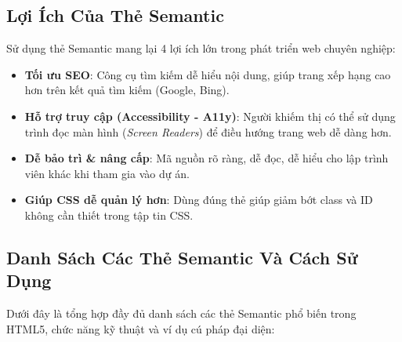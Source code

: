 \subsection{Lợi Ích Của Thẻ Semantic}

Sử dụng thẻ Semantic mang lại 4 lợi ích lớn trong phát triển web chuyên nghiệp:

\begin{itemize}[leftmargin=1.8em, itemsep=6pt, parsep=0pt]
    \item \textbf{Tối ưu SEO}: Công cụ tìm kiếm dễ hiểu nội dung, giúp trang xếp hạng cao hơn trên kết quả tìm kiếm (Google, Bing).
    \item \textbf{Hỗ trợ truy cập (Accessibility - A11y)}: Người khiếm thị có thể sử dụng trình đọc màn hình (\textit{Screen Readers}) để điều hướng trang web dễ dàng hơn.
    \item \textbf{Dễ bảo trì \& nâng cấp}: Mã nguồn rõ ràng, dễ đọc, dễ hiểu cho lập trình viên khác khi tham gia vào dự án.
    \item \textbf{Giúp CSS dễ quản lý hơn}: Dùng đúng thẻ giúp giảm bớt class và ID không cần thiết trong tập tin CSS.
\end{itemize}

\subsection{Danh Sách Các Thẻ Semantic Và Cách Sử Dụng}

Dưới đây là tổng hợp đầy đủ danh sách các thẻ Semantic phổ biến trong HTML5, chức năng kỹ thuật và ví dụ cú pháp đại diện:


